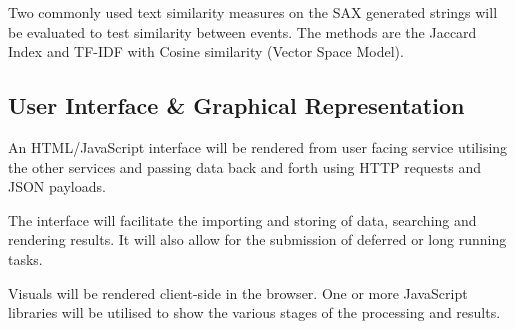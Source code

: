 \documentclass[../report.tex]{subfiles}
\begin{document}
	Two commonly used text similarity measures on the SAX generated strings will be evaluated to test similarity between events.  The methods are the Jaccard Index and TF-IDF with Cosine similarity (Vector Space Model).

\subsection{User Interface \& Graphical Representation}

	An HTML/JavaScript interface will be rendered from user facing service utilising the other services and passing data back and forth using HTTP requests and JSON payloads.
	
	The interface will facilitate the importing and storing of data, searching and rendering results.  It will also allow for the submission of deferred or long running tasks.
	
	Visuals will be rendered client-side in the browser.  One or more JavaScript libraries will be utilised to show the various stages of the processing and results.
\end{document}
